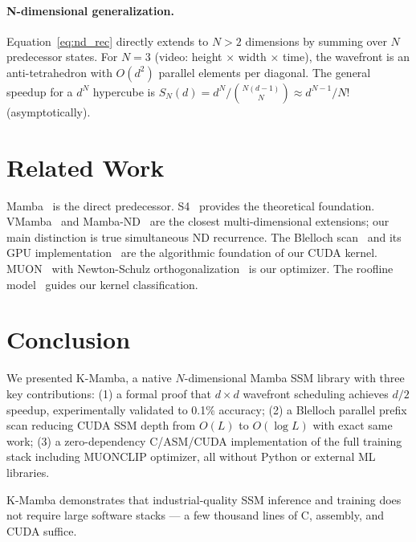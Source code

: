 \documentclass[10pt,twocolumn]{article}
\begin{document}
\paragraph{N-dimensional generalization.}
Equation~\eqref{eq:nd_rec} directly extends to $N > 2$ dimensions
by summing over $N$ predecessor states.
For $N = 3$ (video: height × width × time), the wavefront is
an anti-tetrahedron with $O(d^2)$ parallel elements per diagonal.
The general speedup for a $d^N$ hypercube is
$S_N(d) = d^N / \binom{N(d-1)}{N} \approx d^{N-1}/N!$
(asymptotically).

\section{Related Work}

Mamba~\cite{mamba2023} is the direct predecessor.
S4~\cite{s4} provides the theoretical foundation.
VMamba~\cite{vmamba} and Mamba-ND~\cite{mamband} are the closest
multi-dimensional extensions; our main distinction is true simultaneous ND recurrence.
The Blelloch scan~\cite{blelloch1990} and its GPU implementation~\cite{harris2007gpu}
are the algorithmic foundation of our CUDA kernel.
MUON~\cite{muon2025} with Newton-Schulz orthogonalization~\cite{bjorck1971}
is our optimizer.
The roofline model~\cite{williams2009roofline} guides our kernel classification.

\section{Conclusion}

We presented K-Mamba, a native $N$-dimensional Mamba SSM library
with three key contributions: (1) a formal proof that $d \times d$
wavefront scheduling achieves $d/2$ speedup, experimentally validated
to 0.1\% accuracy; (2) a Blelloch parallel prefix scan reducing
CUDA SSM depth from $O(L)$ to $O(\log L)$ with exact same work;
(3) a zero-dependency C/ASM/CUDA implementation of the full training stack
including MUONCLIP optimizer, all without Python or external ML libraries.

K-Mamba demonstrates that industrial-quality SSM inference and training
does not require large software stacks —
a few thousand lines of C, assembly, and CUDA suffice.



\end{document}
